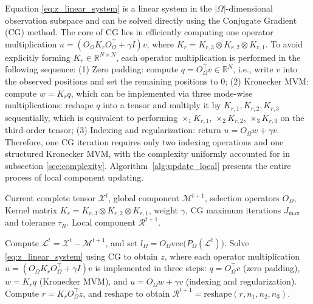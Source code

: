\documentclass[a4paper,12pt]{article}
\numberwithin{equation}{section}
\numberwithin{algorithm}{section}
\theoremstyle{remark}
\theoremstyle{definition}
\begin{document}
Equation \eqref{eq:z_linear_system} is a linear system in the $|\Omega|$-dimensional observation subspace and can be solved directly using the Conjugate Gradient (CG) method. The core of CG lies in efficiently computing one operator multiplication $u=(O_{\Omega}K_r O_{\Omega}^{\top}+\gamma I)v$, where $K_r=K_{r,3}\otimes K_{r,2}\otimes K_{r,1}$. To avoid explicitly forming $K_r\in\mathbb{R}^{N\times N}$, each operator multiplication is performed in the following sequence: (1) Zero padding: compute $q=O_{\Omega}^{\top}v\in\mathbb{R}^{N}$, i.e., write $v$ into the observed positions and set the remaining positions to $0$; (2) Kronecker MVM: compute $w=K_r q$, which can be implemented via three mode-wise multiplications: reshape $q$ into a tensor and multiply it by $K_{r,1},K_{r,2},K_{r,3}$ sequentially, which is equivalent to performing $\times_1 K_{r,1}$, $\times_2 K_{r,2}$, $\times_3 K_{r,3}$ on the third-order tensor; (3) Indexing and regularization: return $u=O_{\Omega}w+\gamma v$. Therefore, one CG iteration requires only two indexing operations and one structured Kronecker MVM, with the complexity uniformly accounted for in subsection \ref{sec:complexity}. Algorithm~\ref{alg:update_local} presents the entire process of local component updating.

\begin{algorithm}[!htbp]
	\caption{Updating the Local Component}
	\label{alg:update_local}
	\begin{algorithmic}[1]
		\REQUIRE Current complete tensor $\mathcal{X}^{t}$, global component $\mathcal{M}^{t+1}$, selection operators $O_{\Omega}$,
		Kernel matrix $K_r=K_{r,3}\otimes K_{r,2}\otimes K_{r,1}$, weight $\gamma$, CG maximum iterations $J_{\max}$ and tolerance $\tau_R$.
		\ENSURE Local component $\mathcal{R}^{t+1}$.
		
		\STATE Compute $\mathcal{L}^{t}=\mathcal{X}^{t}-\mathcal{M}^{t+1}$, and set 
		$l_{\Omega}=O_\Omega\mathrm{vec}\big(P_{\Omega}(\mathcal{L}^{t})\big)$.
		\STATE Solve \eqref{eq:z_linear_system} using CG to obtain $z$, where each operator multiplication $u=(O_{\Omega}K_r O_{\Omega}^{\top}+\gamma I)v$ is implemented in three steps: $q=O_{\Omega}^{\top}v$ (zero padding), $w=K_r q$ (Kronecker MVM), and $u=O_{\Omega}w+\gamma v$ (indexing and regularization).
		\STATE Compute $r=K_r O_{\Omega}^{\top}z$, and reshape to obtain $\mathcal{R}^{t+1}=\mathrm{reshape}(r,n_1,n_2,n_3)$.
	\end{algorithmic}
\end{algorithm}
\end{document}
